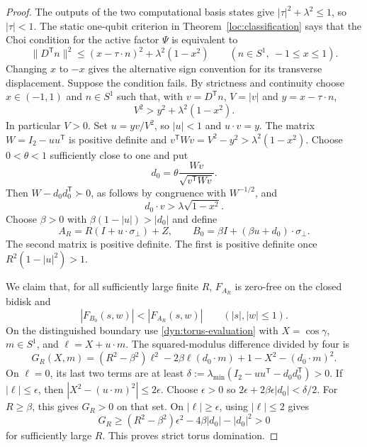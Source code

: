 \documentclass[reqno]{amsart}
\theoremstyle{definition}
\theoremstyle{remark}
\begin{document}
\begin{proof}
The outputs of the two computational basis states give
$|\tau|^2+\lambda^2\le1$, so $|\tau|<1$.
The static one-qubit criterion in Theorem~\ref{loc:classification} says that
the Choi condition for the active factor $\Psi$ is equivalent to
\begin{equation}\label{dyn:static-criterion}
 \|D^{\mathsf T}n\|^2
 \le(x-\tau\cdot n)^2+\lambda^2(1-x^2)
 \qquad(n\in S^1,\ -1\le x\le1).
\end{equation}
Changing $x$ to $-x$ gives the alternative sign convention for its
transverse displacement.
Suppose the condition fails.  By strictness and continuity choose
$x\in(-1,1)$ and $n\in S^1$ such that, with $v=D^{\mathsf T}n$,
$V=|v|$ and $y=x-\tau\cdot n$,
\begin{equation}\label{dyn:static-failure}
 V^2>y^2+\lambda^2(1-x^2).
\end{equation}
In particular $V>0$.  Set $u=yv/V^2$, so $|u|<1$ and $u\cdot v=y$.
The matrix $W=I_2-uu^{\mathsf T}$ is positive definite and
$v^{\mathsf T}Wv=V^2-y^2>\lambda^2(1-x^2)$.
Choose $0<\theta<1$ sufficiently close to one and put
\[
 d_0=\theta\frac{Wv}{\sqrt{v^{\mathsf T}Wv}}.
\]
Then $W-d_0d_0^{\mathsf T}\succ0$, as follows by congruence with
$W^{-1/2}$, and
\begin{equation}\label{dyn:static-separation}
 d_0\cdot v>\lambda\sqrt{1-x^2}.
\end{equation}
Choose $\beta>0$ with $\beta(1-|u|)>|d_0|$ and define
\[
 A_R=R(I+u\cdot\sigma_\perp)+Z,
 \qquad B_0=\beta I+(\beta u+d_0)\cdot\sigma_\perp.
\]
The second matrix is positive definite.  The first is positive definite
once $R^2(1-|u|^2)>1$.

We claim that, for all sufficiently large finite $R$,
$F_{A_R}$ is zero-free on the closed bidisk and
\begin{equation}\label{dyn:static-input-domination}
 |F_{B_0}(s,w)|<|F_{A_R}(s,w)|\qquad(|s|,|w|\le1).
\end{equation}
On the distinguished boundary use \eqref{dyn:torus-evaluation} with
$X=\cos\gamma$, $m\in S^1$, and $\ell=X+u\cdot m$.
The squared-modulus difference divided by four is
\[
 G_R(X,m)=(R^2-\beta^2)\ell^2
 -2\beta\ell(d_0\cdot m)+1-X^2-(d_0\cdot m)^2.
\]
On $\ell=0$, its last two terms are at least
$\delta:=\lambda_{\min}(I_2-uu^{\mathsf T}-d_0d_0^{\mathsf T})>0$.
If $|\ell|\le\epsilon$, then
$|X^2-(u\cdot m)^2|\le2\epsilon$.
Choose $\epsilon>0$ so
$2\epsilon+2\beta\epsilon|d_0|<\delta/2$.
For $R\ge\beta$, this gives $G_R>0$ on that set.
On $|\ell|\ge\epsilon$, using $|\ell|\le2$ gives
\[
 G_R\ge(R^2-\beta^2)\epsilon^2-4\beta|d_0|-|d_0|^2>0
\]
for sufficiently large $R$.  This proves strict torus domination.


\end{proof}
\end{document}
